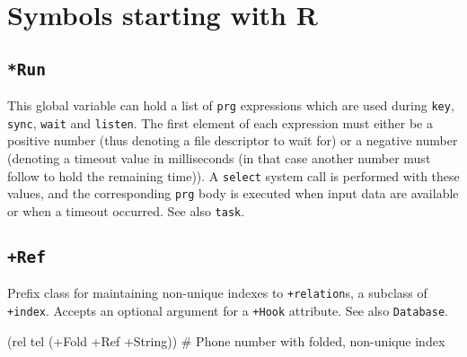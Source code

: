 %
%
%



\chapter{Symbols starting with R}
\label{cha:func-ref-R-functions-starting-with-R}

 
\section*{\texttt{*Run}}
\label{sec:func-ref-R-*Run}


This global variable can hold a list of \texttt{prg} expressions which are used
during \texttt{key}, \texttt{sync}, \texttt{wait} and \texttt{listen}. The first element of each
expression must either be a positive number (thus denoting a file
descriptor to wait for) or a negative number (denoting a timeout value
in milliseconds (in that case another number must follow to hold the
remaining time)). A \texttt{select} system call is performed with these values,
and the corresponding \texttt{prg} body is executed when input data are
available or when a timeout occurred. See also \texttt{task}.



 
\section*{\texttt{+Ref}}
\label{sec:func-ref-R-+Ref}


Prefix class for maintaining non-unique indexes to \texttt{+relation}s, a subclass of \texttt{+index}. Accepts an optional argument for a \texttt{+Hook}
attribute. See also \texttt{Database}.


\begin{wideverbatim}
(rel tel (+Fold +Ref +String))  # Phone number with folded, non-unique index
\end{wideverbatim}

